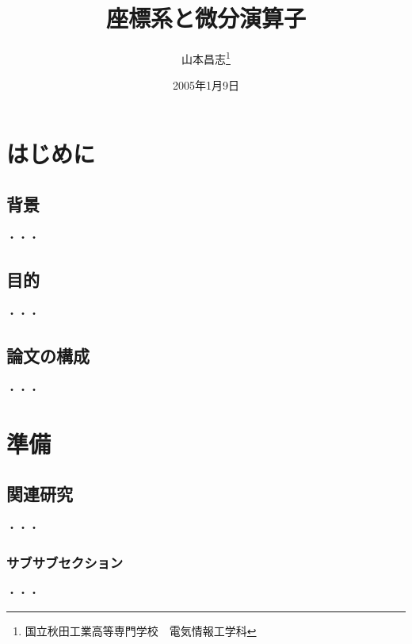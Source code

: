 \documentclass[11pt,a4j]{jsreport}
\title{座標系と微分演算子}
\author{山本昌志\thanks{国立秋田工業高等専門学校　電気情報工学科}}
\date{2005年1月9日}
\begin{document}
 
\maketitle

 
\setcounter{tocdepth}{2}
\tableofcontents
\clearpage

\chapter{はじめに}
\section{背景}
  ・・・
\section{目的}
  ・・・
\section{論文の構成}
  ・・・
\chapter{準備}
\section{関連研究}
  ・・・
\subsection{サブサブセクション}
  ・・・
\end{document}
